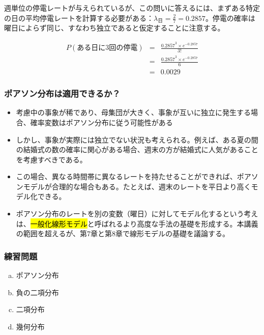 
\begin{frame}


週単位の停電レートが与えられているが、この問いに答えるには、まずある特定の日の平均停電レートを計算する必要がある：$\lambda_{\text{日}} = \frac{2}{7} = 0.2857$。停電の確率は曜日によらず同じ、すなわち独立であると仮定することに注意する。

\begin{eqnarray*}
P(\text{ある日に3回の停電}) &=& \frac{0.2857^3 \times e^{-0.2857}}{3!} \\
&=& \frac{0.2857^3 \times e^{-0.2857}}{6} \\
&=& 0.0029
\end{eqnarray*}

\end{frame}


\begin{frame}
\frametitle{ポアソン分布は適用できるか？}

\begin{itemize}

\item 考慮中の事象が稀であり、母集団が大きく、事象が互いに独立に発生する場合、確率変数はポアソン分布に従う可能性がある

\item しかし、事象が実際には独立でない状況も考えられる。例えば、ある夏の間の結婚式の数の確率に関心がある場合、週末の方が結婚式に人気があることを考慮すべきである。

\item この場合、異なる時間帯に異なるレートを持たせることができれば、ポアソンモデルが合理的な場合もある。たとえば、週末のレートを平日より高くモデル化できる。

\item ポアソン分布のレートを別の変数（曜日）に対してモデル化するという考えは、\hl{一般化線形モデル}と呼ばれるより高度な手法の基礎を形成する。本講義の範囲を超えるが、第7章と第8章で線形モデルの基礎を議論する。

\end{itemize}

\end{frame}


\begin{frame}
\frametitle{練習問題}


\begin{enumerate}[(a)]
\item ポアソン分布
\item 負の二項分布
\item 二項分布
\item 幾何分布
\end{enumerate}

\end{frame}
